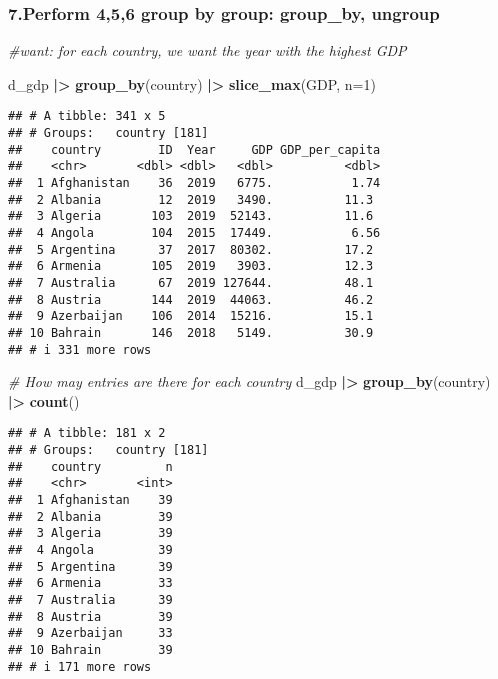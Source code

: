 \documentclass[
]{article}
\newenvironment{Shaded}{\begin{snugshade}}{\end{snugshade}}
\newcommand{\AttributeTok}[1]{\textcolor[rgb]{0.13,0.29,0.53}{#1}}
\newcommand{\CommentTok}[1]{\textcolor[rgb]{0.56,0.35,0.01}{\textit{#1}}}
\newcommand{\DecValTok}[1]{\textcolor[rgb]{0.00,0.00,0.81}{#1}}
\newcommand{\FunctionTok}[1]{\textcolor[rgb]{0.13,0.29,0.53}{\textbf{#1}}}
\newcommand{\NormalTok}[1]{#1}
\newcommand{\SpecialCharTok}[1]{\textcolor[rgb]{0.81,0.36,0.00}{\textbf{#1}}}
\begin{document}
\hypertarget{perform-456-group-by-group-group_by-ungroup}{%
\subsubsection{7.Perform 4,5,6 group by group: group\_by,
ungroup}\label{perform-456-group-by-group-group_by-ungroup}}

\begin{Shaded}
\begin{Highlighting}[]
\CommentTok{\#want: for each country, we want the year with the highest GDP}

\NormalTok{d\_gdp }\SpecialCharTok{|\textgreater{}}
  \FunctionTok{group\_by}\NormalTok{(country) }\SpecialCharTok{|\textgreater{}}
  \FunctionTok{slice\_max}\NormalTok{(GDP, }\AttributeTok{n=}\DecValTok{1}\NormalTok{)}
\end{Highlighting}
\end{Shaded}

\begin{verbatim}
## # A tibble: 341 x 5
## # Groups:   country [181]
##    country        ID  Year     GDP GDP_per_capita
##    <chr>       <dbl> <dbl>   <dbl>          <dbl>
##  1 Afghanistan    36  2019   6775.           1.74
##  2 Albania        12  2019   3490.          11.3 
##  3 Algeria       103  2019  52143.          11.6 
##  4 Angola        104  2015  17449.           6.56
##  5 Argentina      37  2017  80302.          17.2 
##  6 Armenia       105  2019   3903.          12.3 
##  7 Australia      67  2019 127644.          48.1 
##  8 Austria       144  2019  44063.          46.2 
##  9 Azerbaijan    106  2014  15216.          15.1 
## 10 Bahrain       146  2018   5149.          30.9 
## # i 331 more rows
\end{verbatim}

\begin{Shaded}
\begin{Highlighting}[]
\CommentTok{\# How may entries are there for each country}
\NormalTok{d\_gdp }\SpecialCharTok{|\textgreater{}}
  \FunctionTok{group\_by}\NormalTok{(country) }\SpecialCharTok{|\textgreater{}}
  \FunctionTok{count}\NormalTok{()}
\end{Highlighting}
\end{Shaded}

\begin{verbatim}
## # A tibble: 181 x 2
## # Groups:   country [181]
##    country         n
##    <chr>       <int>
##  1 Afghanistan    39
##  2 Albania        39
##  3 Algeria        39
##  4 Angola         39
##  5 Argentina      39
##  6 Armenia        33
##  7 Australia      39
##  8 Austria        39
##  9 Azerbaijan     33
## 10 Bahrain        39
## # i 171 more rows
\end{verbatim}
\end{document}
